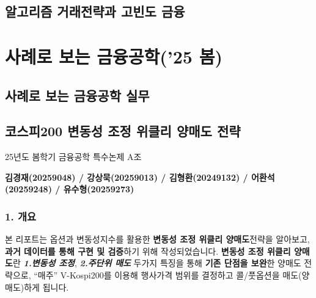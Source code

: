 \documentclass[
  a4paper,
  DIV=11,
  numbers=noendperiod]{scrreprt}
\begin{document}
\chapter*{알고리즘 거래전략과 고빈도
금융}\label{uxc54cuxace0uxb9acuxc998-uxac70uxb798uxc804uxb7b5uxacfc-uxace0uxbe48uxb3c4-uxae08uxc735}


\part{사례로 보는 금융공학('25 봄)}

\chapter*{사례로 보는 금융공학
실무}\label{uxc0acuxb840uxb85c-uxbcf4uxb294-uxae08uxc735uxacf5uxd559-uxc2e4uxbb34}


\chapter*{코스피200 변동성 조정 위클리 양매도
전략}\label{uxcf54uxc2a4uxd53c200-uxbcc0uxb3d9uxc131-uxc870uxc815-uxc704uxd074uxb9ac-uxc591uxb9e4uxb3c4-uxc804uxb7b5}


25년도 봄학기 금융공학 특수논제 A조

\textbf{김경재(20259048) / 강상묵(20259013) / 김형환(20249132) /
어환석(20259248) / 유수형(20259273)}

\section*{1. 개요}\label{uxac1cuxc694}


본 리포트는 옵션과 변동성지수를 활용한 \textbf{변동성 조정 위클리
양매도}전략을 알아보고, \textbf{과거 데이터를 통해 구현 및 검증}하기
위해 작성되었습니다. \textbf{변동성 조정 위클리 양매도}란
\textbf{\emph{1.변동성 조정}}, \textbf{\emph{2.주단위 매도}} 두가지
특징을 통해 \textbf{기존 단점을 보완}한 양매도 전략으로, ``매주''
V-Kospi200를 이용해 행사가격 범위를 결정하고 콜/풋옵션을
매도(양매도)하게 됩니다.
\end{document}
